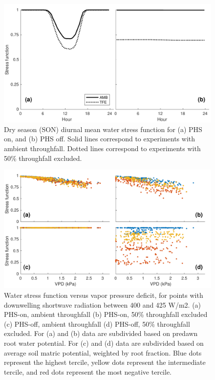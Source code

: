 \documentclass[draft,linenumbers]{agujournal}
\begin{document}
        \clearpage
    \begin{figure}[h]
     \centering
     \includegraphics[width=30pc]{../figs/fig10.pdf}
     \caption{Dry season (SON) diurnal mean water stress function for 
     (a) PHS on, and
     (b) PHS off.
     Solid lines correspond to experiments with ambient throughfall. 
     Dotted lines correspond to experiments with 50\% throughfall excluded.
     }
     \label{fig2}
  \end{figure}
  
    \clearpage
    \begin{figure}[h]
     \centering
     \includegraphics[width=30pc]{../figs/fig9.pdf}
     \caption{Water stress function versus vapor pressure deficit, for points with downwelling shortwave radiation between 400 and 425 W/m2.
     (a) PHS-on, ambient throughfall
     (b) PHS-on, 50\% throughfall excluded
     (c) PHS-off, ambient throughfall
     (d) PHS-off, 50\% throughfall excluded. 
     For (a) and (b) data are subdivided based on predawn root water potential.
     For (c) and (d) data are subdivided based on average soil matric potential, weighted by root fraction.
     Blue dots represent the highest tercile, yellow dots represent the intermediate tercile, and red dots represent the most negative tercile.
     }
     \label{fig2}
  \end{figure}
  
\end{document}
